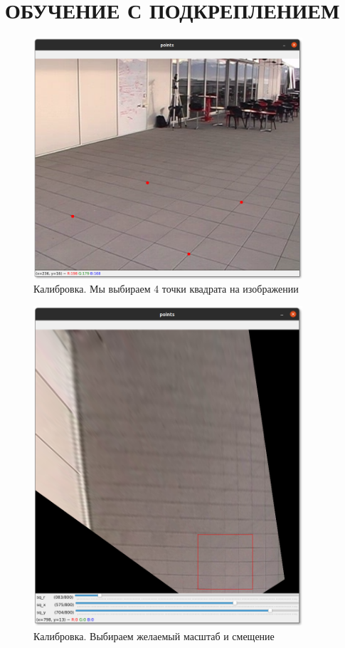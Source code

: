 \chapter{ОБУЧЕНИЕ С ПОДКРЕПЛЕНИЕМ}




\begin{figure}[H]
    \centering
    \includegraphics[width=10cm]{images/calibration1.png}
    \caption{Калибровка. Мы выбираем 4 точки квадрата на изображении}
    \label{<label>}
\end{figure}

\begin{figure}[H]
    \centering
    \includegraphics[width=10cm]{images/calibration2.png}
    \caption{Калибровка. Выбираем желаемый масштаб и смещение}
    \label{<label>}
\end{figure}

